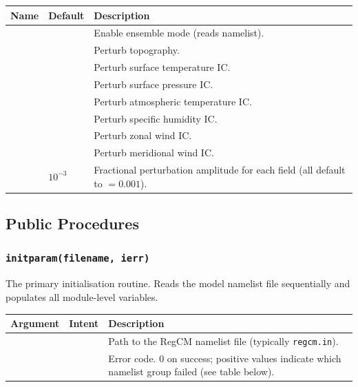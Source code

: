 \begin{longtable}{L{4.5cm} L{3cm} L{6.5cm}}
  \toprule
  \textbf{Name} & \textbf{Default} & \textbf{Description} \\
  \midrule
  \endhead
  \bottomrule
  \endfoot
        &  &
    Enable ensemble mode (reads  namelist). \\
       &  & Perturb topography. \\
         &  & Perturb surface temperature IC. \\
         &  & Perturb surface pressure IC. \\
          &  & Perturb atmospheric temperature IC. \\
          &  & Perturb specific humidity IC. \\
          &  & Perturb zonal wind IC. \\
          &  & Perturb meridional wind IC. \\
     & $10^{-3}$      &
    Fractional perturbation amplitude for each field (all default to
     $=0.001$). \\
\end{longtable}

\subsection{Public Procedures}
\label{subsec:dynparam_procs}

\subsubsection{\texttt{initparam(filename, ierr)}}

The primary initialisation routine. Reads the model namelist file
sequentially and populates all module-level variables.

\begin{longtable}{L{3cm} L{3cm} L{8cm}}
  \toprule
  \textbf{Argument} & \textbf{Intent} & \textbf{Description} \\
  \midrule
  \endhead
  \bottomrule
  \endfoot
   &  &
    Path to the RegCM namelist file (typically \texttt{regcm.in}). \\
       &  &
    Error code. 0 on success; positive values indicate which namelist
    group failed (see table below). \\
\end{longtable}

